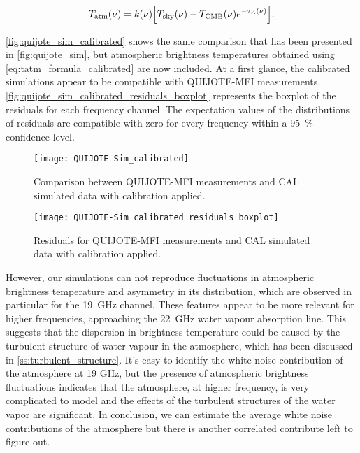 \begin{equation}
        T_\text{atm}\qty(\nu) = k\qty(\nu)\qty[T_\text{sky}\qty(\nu) -
        T_\text{CMB}\qty(\nu)e^{-\tau_A\qty(\nu)}].
        \label{eq:tatm_formula_calibrated}
\end{equation}

\autoref{fig:quijote_sim_calibrated} shows the same comparison that has
been presented in \autoref{fig:quijote_sim}, but atmospheric brightness
temperatures obtained using \autoref{eq:tatm_formula_calibrated} are now
included. At a first glance, the calibrated simulations appear to be
compatible with QUIJOTE-MFI measurements.
\autoref{fig:quijote_sim_calibrated_residuals_boxplot} represents the
boxplot of the residuals for each frequency channel. The expectation values
of the distributions of residuals are compatible with zero for every
frequency within a \SI{95}{\percent} confidence level.

\begin{figure}
        \centering
        \texttt{[image: QUIJOTE-Sim\_calibrated]}
        \caption{Comparison between QUIJOTE-MFI measurements and
        CAL simulated data with calibration applied.}
        \label{fig:quijote_sim_calibrated}
\end{figure}

\begin{figure}
        \centering
        \texttt{[image: QUIJOTE-Sim\_calibrated\_residuals\_boxplot]}
        \caption{Residuals for QUIJOTE-MFI measurements and
        CAL simulated data with calibration applied.}
        \label{fig:quijote_sim_calibrated_residuals_boxplot}
\end{figure}

However, our simulations can not reproduce fluctuations in atmospheric
brightness temperature and asymmetry in its distribution, which are
observed in particular for the \SI{19}{\giga\hertz} channel.  These
features appear to be more relevant for higher frequencies, approaching the
\SI{22}{\giga\hertz} water vapour absorption line. This suggests that the
dispersion in brightness temperature could be caused by the turbulent
structure of water vapour in the atmosphere, which has been discussed in
\autoref{ss:turbulent_structure}. It's easy to identify the white noise
contribution of the atmosphere at 19 GHz, but the presence of atmospheric
brightness fluctuations indicates that the atmosphere, at higher frequency,
is very complicated to model and the effects of the turbulent structures of
the water vapor are significant.  In conclusion, we can
estimate the average white noise contributions of the atmosphere but there
is another correlated contribute left to figure out.
